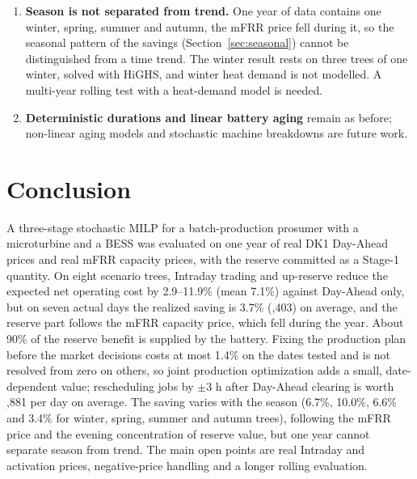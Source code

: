 \documentclass[journal]{IEEEtran}
\begin{document}
\begin{enumerate}
    \item \textbf{Season is not separated from trend.} One year of data contains one winter, spring, summer and autumn, the mFRR price fell during it, so the seasonal pattern of the savings (Section~\ref{sec:seasonal}) cannot be distinguished from a time trend. The winter result rests on three trees of one winter, solved with HiGHS, and winter heat demand is not modelled. A multi-year rolling test with a heat-demand model is needed.
    \item \textbf{Deterministic durations and linear battery aging} remain as before; non-linear aging models and stochastic machine breakdowns are future work.
\end{enumerate}

\section{Conclusion}
A three-stage stochastic MILP for a batch-production prosumer with a microturbine and a BESS was evaluated on one year of real DK1 Day-Ahead prices and real mFRR capacity prices, with the reserve committed as a Stage-1 quantity. On eight scenario trees, Intraday trading and up-reserve reduce the expected net operating cost by 2.9--11.9\% (mean 7.1\%) against Day-Ahead only, but on seven actual days the realized saving is 3.7\% (,403) on average, and the reserve part follows the mFRR capacity price, which fell during the year. About 90\% of the reserve benefit is supplied by the battery. Fixing the production plan before the market decisions costs at most 1.4\% on the dates tested and is not resolved from zero on others, so joint production optimization adds a small, date-dependent value; rescheduling jobs by $\pm3$ h after Day-Ahead clearing is worth ,881 per day on average. The saving varies with the season (6.7\%, 10.0\%, 6.6\% and 3.4\% for winter, spring, summer and autumn trees), following the mFRR price and the evening concentration of reserve value, but one year cannot separate season from trend. The main open points are real Intraday and activation prices, negative-price handling and a longer rolling evaluation.
\end{document}
